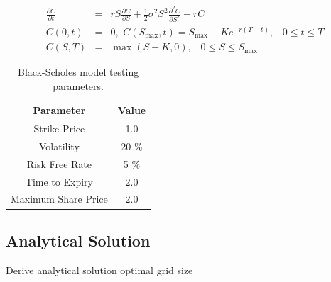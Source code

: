 \documentclass[12pt, oneside]{book}
\theoremstyle{plain}
\theoremstyle{definition}
\begin{document}
\begin{eqnarray}
\frac{\partial C}{\partial t} &=& rS\frac{\partial C}{\partial S}+\frac{1}{2} \sigma^2 S^2 \frac{\partial^2 C}{\partial S^2} - rC \\[10pt]
C(0,t) &=& 0, \hspace{4pt} C(S_{\max},t)=S_{\max} - K e^{-r(T-t)}, \hspace{10pt} 0 \leq t \leq T \\[10pt]
C(S,T) &=& \max(S-K,0), \hspace{10pt} 0 \leq S \leq S_{\max}
\end{eqnarray}



\begin{table}[h!]
\centering
 \begin{tabular}{||c c||} 
 \hline
 Parameter & Value\\ [0.5ex] 
 \hline\hline
 Strike Price & 1.0\\ 
 Volatility & 20 \% \\
 Risk Free Rate & 5 \% \\
 Time to Expiry & 2.0\\
 Maximum Share Price & 2.0\\ [1ex] 
 \hline
 \end{tabular}
 \caption{Black-Scholes model testing parameters.}
\end{table}



\subsection{Analytical Solution}

Derive analytical solution optimal grid size
\end{document}
